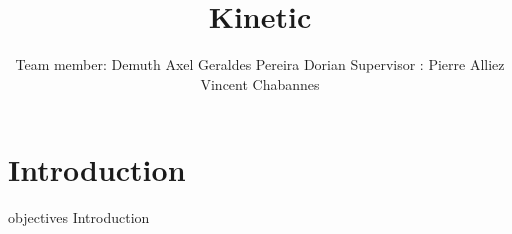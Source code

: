 \documentclass[10pt]{beamer}
\title{Kinetic}
\author{Team member: \newline\newline Demuth Axel \newline Geraldes Pereira Dorian \newline\newline Supervisor :  \newline\newline Pierre Alliez \newline Vincent Chabannes}
\date{}
\begin{document}
\frame{\titlepage}
\begin{frame}
    \tableofcontents
\end{frame}
\section{Introduction}

\begin{frame}[plain]{objectives}
    Introduction
\end{frame}
\end{document}
